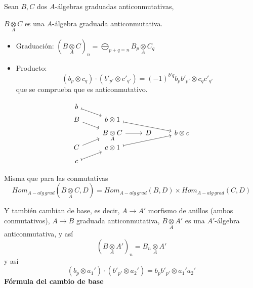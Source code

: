 Sean $B,C$ dos $A$-\'algebras graduadas anticonmutativas,
\begin{prop}
    $B \underset{A}{\otimes} C$ es una $A$-\'algebra graduada anticonmutativa. 
\end{prop}
\begin{dem} 
    \begin{itemize}
        \item Graduaci\'on: $\displaystyle (B \underset{A}{\otimes} C)_n = \bigoplus_{p+q=n} B_p \underset{A}{\otimes} C_q$
        \item Producto:
        $$(b_p \otimes c_q) \cdot (b'_{p'} \otimes c'_{q'}) = (-1)^{b'q} b_pb'_{p'} \otimes c_q c'_{q'}$$
        que se comprueba que es anticonmutativo.
    \end{itemize}
\end{dem}
\begin{obs}
    $$\bt b \arrow[mapsto]{rd} \\[-5mm] B \arrow{dr} & b\otimes 1 \arrow[mapsto]{rrd} \\[-5mm] & B \underset{A}{\otimes} C \arrow{r} & D & b\otimes c 
    \\[-7mm] C \arrow{ur} & c\otimes 1 \arrow[mapsto]{rru} \\[-4mm] c \arrow[mapsto]{ru} \et$$
\end{obs}
\begin{propi}
     Misma que para las conmutativas
    $$Hom_{A-alg\,grad} (B \underset{A}{\otimes} C , D) = Hom_{A-alg \, grad}(B, D) \times Hom_{A-alg \,grad}(C, D)$$
\end{propi}
Y tambi\'en cambian de base, es decir, $A \longrightarrow A'$ morfismo de anillos (ambos conmutativos), $A\longrightarrow B$ graduada anticonmutativa, $B \underset{A}{\otimes}A'$ es una $A'$-\'algebra anticonmutativa, y as\'i
$$(B \underset{A}{\otimes} A')_n = B_n \underset{A}{\otimes} A'$$
y as\'i
$$(b_p \otimes a_1') \cdot (b'_{p'} \otimes a_2') = b_p b'_{p'} \otimes a_1' a_2'$$
\textbf{F\'ormula del cambio de base}

